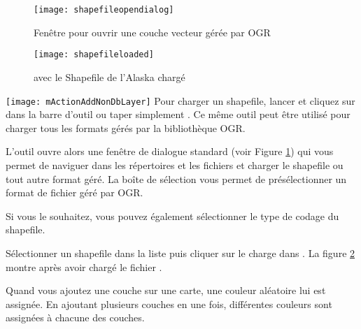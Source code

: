 \begin{figure}[ht]
  \begin{center} 
  \texttt{[image: shapefileopendialog]}
  \caption{Fenêtre pour ouvrir une couche vecteur gérée par OGR \nixcaption}\label{fig:openshapefile}
\end{center}
\end{figure}

\begin{figure}[ht]
  \begin{center}
  \texttt{[image: shapefileloaded]}
    \caption{\qg avec le Shapefile de l'Alaska chargé \nixcaption}\label{fig:loadedshapefile}
\end{center}
\end{figure}

\texttt{[image: mActionAddNonDbLayer]} Pour charger un shapefile, lancer \qg et cliquez sur  dans la barre d'outil ou taper simplement . Ce même outil peut être utilisé pour charger tous les formats gérés par la bibliothèque OGR.

L'outil ouvre alors une fenêtre de dialogue standard (voir Figure \ref{fig:openshapefile}) qui vous permet de naviguer dans les répertoires et les fichiers et charger le shapefile ou tout autre format géré.
La boîte de sélection  vous permet de présélectionner un format de fichier géré par OGR.

Si vous le souhaitez, vous pouvez également sélectionner le type de codage du shapefile.

Sélectionner un shapefile dans la liste puis cliquer sur  le charge dans \qg. La figure \ref{fig:loadedshapefile} montre \qg après avoir chargé le fichier .

\begin{Tip}\caption{\textsc{Couleurs de couches}}
Quand vous ajoutez une couche sur une carte, une couleur aléatoire lui est assignée. En ajoutant plusieurs couches en une fois, différentes couleurs sont assignées à chacune des couches.
\end{Tip}

